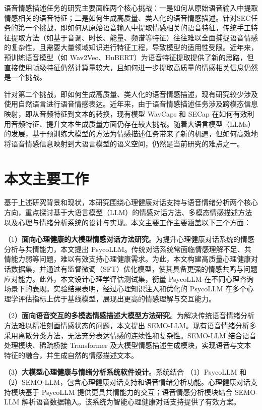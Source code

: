 语音情感描述任务的研究主要面临两个核心挑战：一是如何从原始语音输入中提取情感相关的语音特征；二是如何生成高质量、类人化的语音情感描述。针对SEC任务的第一个挑战，即如何从原始语音输入中提取情感相关的语音特征，传统手工特征提取方法（如基于音调、时长、能量、频谱等特征）往往难以全面捕捉语音情感的复杂性，且需要大量领域知识进行特征工程，导致模型的适用性受限。近年来，预训练语音模型（如 Wav2Vec\cite{Schneider_Baevski_Collobert_Auli_2019}、HuBERT\cite{Hsu_Bolte_Tsai_Lakhotia_Salakhutdinov_Mohamed_2021}）为语音特征提取提供了新的思路，但直接使用帧级特征仍然计算量较大，且如何进一步提取高质量的情感相关信息仍然是一个挑战。

针对第二个挑战，即如何生成高质量、类人化的语音情感描述，现有研究较少涉及使用自然语言进行语音情感表达。近年来，由于语音情感描述任务涉及跨模态信息映射，即从音频特征到文本的转换，现有模型 WavCaps\cite{Mei_Meng_Liu_Kong_Ko_Zhao_Plumbley_Zou_Wang} 和 SECap\cite{xu2024secap} 在如何有效利用音频特征、提升文本生成质量方面仍存在较大挑战。随着大语言模型（LLMs）的发展，基于预训练大模型的方法为情感描述任务带来了新的机遇，但如何高效地将语音情感信息映射到大语言模型的语义空间，仍然是当前研究的难点之一。

\section{本文主要工作}

基于上述研究背景和现状，本研究围绕心理健康对话支持与语音情绪分析两个核心方向，重点探讨基于大语言模型（LLM）的情感对话方法、多模态情感描述方法以及心理与情绪分析系统的设计与实现。本文主要工作主要涵盖以下三个方面：

（1）\textbf{面向心理健康的大模型情感对话方法研究}。为提升心理健康对话系统的情感分析与共情能力，本文提出 PsycoLLM。传统对话系统常面临情感理解不足、共情能力弱等问题，难以有效支持心理健康需求。为此，本文构建高质量心理健康对话数据集，并通过有监督微调（SFT）优化模型，使其具备更强的情感共鸣与问题应对能力。此外，本文设计心理学评估测试集，衡量 PsycoLLM 在不同心理咨询场景下的表现。实验结果表明，经过心理知识注入和优化的 PsycoLLM 在多个心理学评估指标上优于基线模型，展现出更高的情感理解与交互能力。

（2）\textbf{面向语音交互的多模态情感描述大模型方法研究}。为解决传统语音情绪分析方法难以精准刻画情感状态的问题，本文提出 SEMO-LLM。现有语音情绪分析多采用离散分类方法，无法充分表达情感的连续性和复杂性。SEMO-LLM 结合语音处理模块、稀疏桥接 Transformer 及大模型情感描述生成模块，实现语音与文本特征的融合，并生成自然的情感描述文本。

（3）\textbf{大模型心理健康与情绪分析系统软件设计}。系统结合 （1）PsycoLLM 和 （2）SEMO-LLM，包含心理健康对话支持和语音情绪分析功能。心理健康对话支持模块基于 PsycoLLM 提供更具共情能力的交互；语音情感分析模块结合 SEMO-LLM 解析语音数据输入。该系统为智能心理健康对话支持提供了有效方案。

